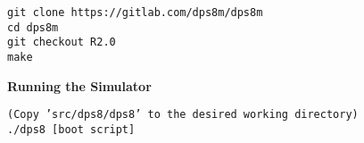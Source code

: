 \begin{adjustwidth}{5ex}{1ex}
    \texttt{git clone https://gitlab.com/dps8m/dps8m} \\
    \texttt{cd dps8m} \\
    \texttt{git checkout R2.0} \\
    \texttt{make} \\
\end{adjustwidth}  

\textbf{Running the Simulator}

\begin{adjustwidth}{5ex}{1ex}
    \texttt{(Copy 'src/dps8/dps8' to the desired working directory)} \\
    \texttt{./dps8 [boot script]} \\
\end{adjustwidth}  














